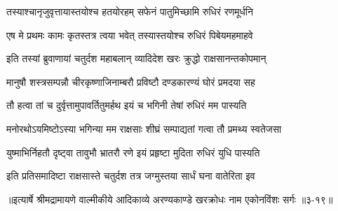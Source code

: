 \twolineshloka
{तस्याश्चानृजुवृत्तायास्तयोश्च हतयोरहम्}
{सफेनं पातुमिच्छामि रुधिरं रणमूर्धनि} %

\twolineshloka
{एष मे प्रथमः कामः कृतस्तत्र त्वया भवेत्}
{तस्यास्तयोश्च रुधिरं पिबेयमहमाहवे} %

\twolineshloka
{इति तस्यां ब्रुवाणायां चतुर्दश महाबलान्}
{व्यादिदेश खरः क्रुद्धो राक्षसानन्तकोपमान्} %

\twolineshloka
{मानुषौ शस्त्रसम्पन्नौ चीरकृष्णाजिनाम्बरौ}
{प्रविष्टौ दण्डकारण्यं घोरं प्रमदया सह} %

\twolineshloka
{तौ हत्वा तां च दुर्वृत्तामुपावर्तितुमर्हथ}
{इयं च भगिनी तेषां रुधिरं मम पास्यति} %

\twolineshloka
{मनोरथोऽयमिष्टोऽस्या भगिन्या मम राक्षसाः}
{शीघ्रं सम्पाद्यतां गत्वा तौ प्रमथ्य स्वतेजसा} %

\twolineshloka
{युष्माभिर्निहतौ दृष्ट्वा तावुभौ भ्रातरौ रणे}
{इयं प्रहृष्टा मुदिता रुधिरं युधि पास्यति} %

\twolineshloka
{इति प्रतिसमादिष्टा राक्षसास्ते चतुर्दश}
{तत्र जग्मुस्तया सार्धं घना वातेरिता इव} %


॥इत्यार्षे श्रीमद्रामायणे वाल्मीकीये आदिकाव्ये अरण्यकाण्डे खरक्रोधः नाम एकोनविंशः सर्गः ॥३-१९॥
